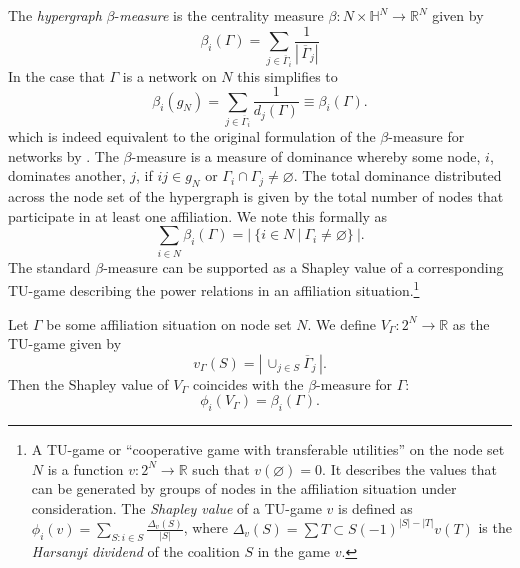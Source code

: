 The \emph{hypergraph} $\beta$-\emph{measure} is the centrality measure $\beta \colon N \times \mathbb{H}^N \to \mathbb{R}^N$ given by
\begin{equation}
\beta_i (\Gamma ) = \sum_{j \in \overline{\Gamma}_i} \frac{1}{\left| \, \overline{\Gamma}_j \right|}
\end{equation}
In the case that $\Gamma$ is a network on $N$ this simplifies to
\begin{equation}
\beta_i (g_{N}) = \sum_{j \in \overline{\Gamma}_i} \frac{1}{d_j (\Gamma )} \equiv \beta_i (\Gamma ) .
\end{equation}
which is indeed equivalent to the original formulation of the $\beta$-measure for networks by \citet{BrinkGilles2000}. The $\beta$-measure is a measure of dominance whereby some node, $i$, dominates another, $j$, if $ij \in g_{N}$ or $\Gamma_{i} \cap \Gamma_{j} \neq \varnothing$. The total dominance distributed across the node set of the hypergraph is given by the total number of nodes that participate in at least one affiliation. We note this formally as
\begin{equation}
\sum_{i \in N} \beta_{i}(\Gamma) = | ~ \{ i \in N ~ | ~ \Gamma_{i} \neq \varnothing \} ~ | .
\end{equation}
The standard $\beta$-measure can be supported as a Shapley value of a corresponding TU-game describing the power relations in an affiliation situation.\footnote{A TU-game or ``cooperative game with transferable utilities'' on the node set $N$ is a function $v \colon 2^N \to \mathbb{R}$ such that $v( \varnothing )=0$. It describes the values that can be generated by groups of nodes in the affiliation situation under consideration. The \emph{Shapley value} of a TU-game $v$ is defined as $\phi_i (v) = \sum_{S \colon i \in S} \frac{\Delta_v (S)}{|S|}$, where $\Delta_v (S) = \sum{T \subset S} (-1)^{|S|-|T|} v(T)$ is the \emph{Harsanyi dividend} of the coalition $S$ in the game $v$.}
\begin{theorem}
Let $\Gamma$ be some affiliation situation on node set $N$. We define $V_{\Gamma} \colon 2^N \to \mathbb{R}$ as the TU-game given by
\begin{equation}
v_{\Gamma} (S) = \left| \, \cup_{j \in S} \overline{\Gamma}_j \, \right| .
\end{equation}
Then the Shapley value of $V_{\Gamma}$ coincides with the $\beta$-measure for $\Gamma \colon$
\begin{equation}
\phi_i \left( V_{\Gamma} \right) = \beta_i (\Gamma ) .
\end{equation}
\end{theorem}
